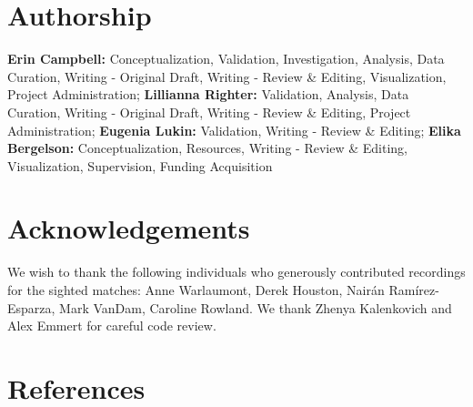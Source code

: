 \documentclass[
  man,floatsintext]{apa6}
\begin{document}
\hypertarget{authorship}{%
\section{Authorship}\label{authorship}}

\textbf{Erin Campbell:} Conceptualization, Validation, Investigation, Analysis, Data Curation, Writing - Original Draft, Writing - Review \& Editing, Visualization, Project Administration; \textbf{Lillianna Righter:} Validation, Analysis, Data Curation, Writing - Original Draft, Writing - Review \& Editing, Project Administration; \textbf{Eugenia Lukin:} Validation, Writing - Review \& Editing; \textbf{Elika Bergelson:} Conceptualization, Resources, Writing - Review \& Editing, Visualization, Supervision, Funding Acquisition

\hypertarget{acknowledgements}{%
\section{Acknowledgements}\label{acknowledgements}}

We wish to thank the following individuals who generously contributed recordings for the sighted matches: Anne Warlaumont, Derek Houston, Nairán Ramírez-Esparza, Mark VanDam, Caroline Rowland. We thank Zhenya Kalenkovich and Alex Emmert for careful code review.

\hypertarget{references}{%
\section*{References}\label{references}}
\end{document}
